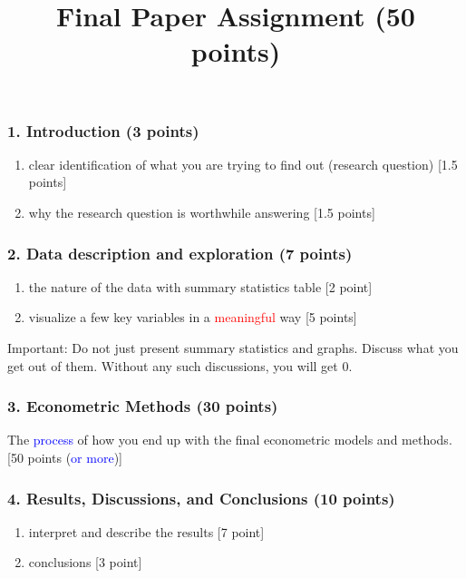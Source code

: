 \documentclass[fleqn]{beamer}\usepackage[]{graphicx}\usepackage[]{color}
\begin{document}
\title{Final Paper Assignment (50 points)}
\author{}
\everymath{\displaystyle}

\begin{frame}
\titlepage
\end{frame}

\begin{frame}[c]
  \frametitle{1. Introduction (3 points)}
    \begin{enumerate}
      \item clear identification of what you are trying to find out (research question) [1.5 points]
      \item why the research question is worthwhile answering [1.5 points]
    \end{enumerate}
\end{frame}

\begin{frame}[c]
  \frametitle{2. Data description and exploration (7 points)}
     \begin{enumerate}
      \item the nature of the data with summary statistics table [2 point]
      \item visualize a few key variables in a \textcolor{red}{meaningful} way [5 points]

    \end{enumerate}
  \begin{block}{Important:}  
    Do not just present summary statistics and graphs. Discuss what you get out of them. Without any such discussions, you will get $0$.
  \end{block}
\end{frame}


\begin{frame}[c]
  \frametitle{3. Econometric Methods (30 points)}
    The \textcolor{blue}{process} of how you end up with the final econometric models and methods. [50 points (\textcolor{blue}{or more})]   
\end{frame}

\begin{frame}[c]
  \frametitle{4. Results, Discussions, and Conclusions (10 points)}
  \begin{enumerate}
        \item interpret and describe the results [7 point]
        \item conclusions [3 point]
  \end{enumerate}
\end{frame}
\end{document}
